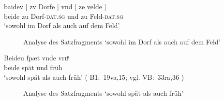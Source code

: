\begin{exe}
\ex \label{ex:beidquantsyncont}
	\begin{xlist}
	\ex \label{ex:caokoordsyn_3_2}
		\gll baidev \textup{[} zv Dorfe \textup{]} vnd
				\textup{[} ze velde \textup{]} \\
			beide {} zu Dorf-\textsc{dat.sg} {} und {} zu Feld-\textsc{dat.sg}
				{} \\
		\trans `sowohl im Dorf als auch auf dem Feld'
			\parencites(Nr.~3319, Michelstetten, Bz.~Mistelbach, 1299)[461,28]{cao4}

		\begin{figure}
		\caption{Analyse des Satzfragments  `sowohl im Dorf als auch auf dem Feld'}
		\label{fig:caokoordsyn_3_2}
		\end{figure}

	\ex \label{ex:syntintvar1_2}
		\gll Beideu {\ob} ſpæt {\cb} vnde
			{\ob} vruͦ {\cb} \\
			beide {} spät {} und {} früh {} \\
		\trans `sowohl spät als auch früh'
			(%
				B1:~19va,15; vgl.
				VB:~33ra,36%
			)

		\begin{figure}
		\caption{Analyse des Satzfragments  `sowohl spät als auch früh'}
		\label{fig:syntintvar1_2}
		\end{figure}
	\end{xlist}
\end{exe}

